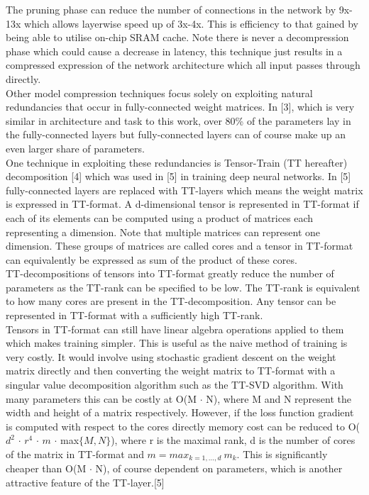 \documentclass{article}
\begin{document}
The pruning phase can reduce the number of connections in the network by 9x-13x which allows layerwise speed up of 3x-4x. This is efficiency to that gained by being able to utilise on-chip SRAM cache. Note there is never a decompression phase which could cause a decrease in latency, this technique just results in a compressed expression of the network architecture which all input passes through directly.\\

Other model compression techniques focus solely on exploiting natural redundancies that occur in fully-connected weight matrices. In [3], which is very similar in architecture and task to this work, over 80\% of the parameters lay in the fully-connected layers but fully-connected layers can of course make up an even larger share of parameters.\\

One technique in exploiting these redundancies is Tensor-Train (TT hereafter) decomposition [4] which was used in [5] in training deep neural networks. In [5] fully-connected layers are replaced with TT-layers which means the weight matrix is expressed in TT-format. A d-dimensional tensor is represented in TT-format if each of its elements can be computed using a product of matrices each representing a dimension. Note that multiple matrices can represent one dimension. These groups of matrices are called cores and a tensor in TT-format can equivalently be expressed as sum of the product of these cores. \\

TT-decompositions of tensors into TT-format greatly reduce the number of parameters as the TT-rank can be specified to be low. The TT-rank is equivalent to how many cores are present in the TT-decomposition. Any tensor can be represented in TT-format with a sufficiently high TT-rank.\\

Tensors in TT-format can still have linear algebra operations applied to them which makes training simpler. This is useful as the naive method of training is very costly. It would involve using stochastic gradient descent on the weight matrix directly and then converting the weight matrix to TT-format with a singular value decomposition algorithm such as the TT-SVD algorithm. With many parameters this can be costly at O(M $\cdot$ N), where M and N represent the width and height of a matrix respectively. However, if the loss function gradient is computed with respect to the cores directly memory cost can be reduced to O($d^2$ $\cdot$ $r^4$ $\cdot$ $m$ $\cdot$ max$\{M, N\}$), where r is the maximal rank, d is the number of cores of the matrix in TT-format and $m = max_{k=1,...,d} \ m_k$. This is significantly cheaper than O(M $\cdot$ N), of course dependent on parameters, which is another attractive feature of the TT-layer.[5]\\
\end{document}
